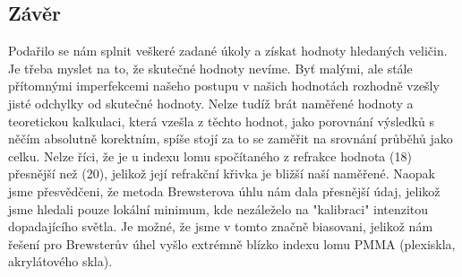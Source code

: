 \documentclass[czech,11pt,a4paper]{article}
\begin{document}
\begin{multicols}{2}
		\section{Závěr}
		Podařilo se nám splnit veškeré zadané úkoly a získat hodnoty hledaných veličin. Je třeba myslet na to, že skutečné hodnoty nevíme. Byť malými, ale stále přítomnými imperfekcemi našeho postupu v našich hodnotách rozhodně vzešly jisté odchylky od skutečné hodnoty. Nelze tudíž brát naměřené hodnoty a teoretickou kalkulaci, která vzešla z těchto hodnot, jako porovnání výsledků s něčím absolutně korektním, spíše stojí za to se zaměřit na srovnání průběhů jako celku. Nelze říci, že je u indexu lomu spočítaného z refrakce hodnota (18) přesnější než (20), jelikož její refrakční křivka je bližší naší naměřené. Naopak jsme přesvědčeni, že metoda Brewsterova úhlu nám dala přesnější údaj, jelikož jsme hledali pouze lokální minimum, kde nezáleželo na "kalibraci" intenzitou dopadajícího světla. Je možné, že jsme v tomto značně biasovani, jelikož nám řešení pro Brewsterův úhel vyšlo extrémně blízko indexu lomu PMMA (plexiskla, akrylátového skla). 
	
		

		
		
		
		
		
	\end{multicols}
\end{document}
